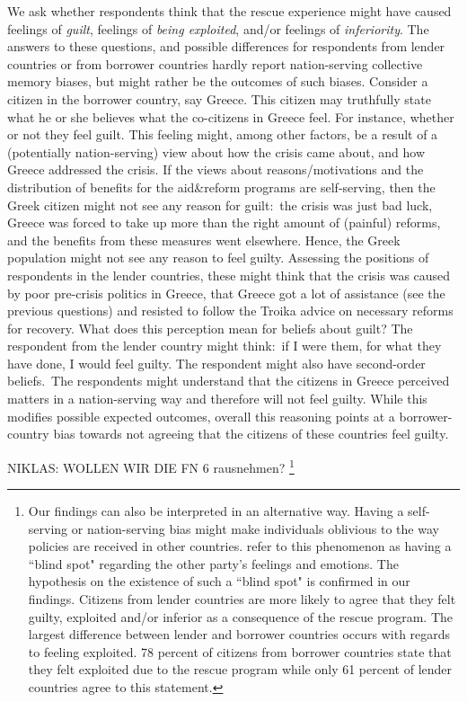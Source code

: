 We ask whether respondents think that the rescue experience might
have caused feelings of \textit{guilt}, feelings of \textit{being
exploited}, and/or feelings of \textit{inferiority}. The answers to these
questions, and possible differences for respondents from lender countries or
from borrower countries hardly report
nation-serving collective memory biases, but might rather be the outcomes of
such biases. Consider a citizen in the borrower country, say Greece. This
citizen may truthfully state what he or she believes what the
co-citizens in Greece feel. For instance, whether or not they feel guilt.
This feeling might, among other factors, be a result of a (potentially
nation-serving) view about how the crisis came about, and how Greece
addressed the crisis. If the views about reasons/motivations and the
distribution of benefits for the aid\&reform programs are self-serving, then
the Greek citizen might not see any reason for guilt:\ the crisis was just
bad luck, Greece was forced to take up more than the right amount of
(painful) reforms, and the benefits from these measures went elsewhere.
Hence, the Greek population might not see any reason to feel guilty.
Assessing the positions of respondents in the lender countries, these might
think that the crisis was caused by poor pre-crisis politics in Greece, that
Greece got a lot of assistance (see the previous questions) and resisted to
follow the Troika advice on necessary reforms for recovery. What does this
perception mean for beliefs about guilt? The respondent from the lender
country might think:\ if I were them, for what they have done, I would feel
guilty. The respondent might also have second-order beliefs.\ The respondents
might understand that the citizens in Greece perceived matters in a
nation-serving way and therefore will not feel guilty. While this modifies
possible expected outcomes, overall this reasoning points at a
borrower-country bias towards not agreeing that the citizens of these
countries feel guilty. 

NIKLAS: WOLLEN WIR DIE FN 6 rausnehmen?
\footnote{Our findings can also be interpreted in an alternative way.  Having a self-serving or nation-serving bias might make individuals oblivious to
the way policies are received in other countries. 
\cite{dezso} refer to this phenomenon as having a ``blind spot" regarding the other party's 
feelings and emotions. The hypothesis on the existence of such a ``blind spot" is confirmed in our findings.
Citizens from lender countries are more likely to agree that they felt guilty, exploited and/or inferior as a 
consequence of the rescue program. The largest difference between lender and borrower countries occurs with regards to feeling exploited.
78 percent  of citizens from borrower countries state that they felt exploited due to the rescue program while only 61 percent of lender countries
agree to this statement. 
}

